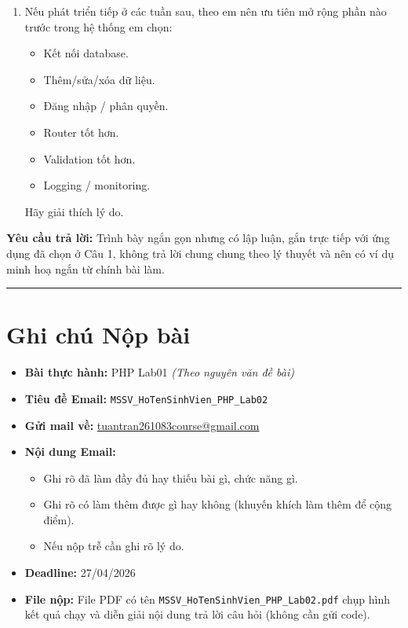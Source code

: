 \documentclass[12pt,a4paper]{article}
\begin{document}
\begin{enumerate}
    \item Nếu phát triển tiếp ở các tuần sau, theo em nên ưu tiên mở rộng phần nào trước trong hệ thống em chọn:
    \begin{itemize}[noitemsep]
        \item Kết nối database.
        \item Thêm/sửa/xóa dữ liệu.
        \item Đăng nhập / phân quyền.
        \item Router tốt hơn.
        \item Validation tốt hơn.
        \item Logging / monitoring.
    \end{itemize}
    Hãy giải thích lý do.
\end{enumerate}

\textbf{Yêu cầu trả lời:} Trình bày ngắn gọn nhưng có lập luận, gắn trực tiếp với ứng dụng đã chọn ở Câu 1, không trả lời chung chung theo lý thuyết và nên có ví dụ minh hoạ ngắn từ chính bài làm.

\vspace{5mm}
\hrule
\vspace{5mm}

\section*{Ghi chú Nộp bài}
\begin{itemize}
    \item \textbf{Bài thực hành:} PHP Lab01 \textit{(Theo nguyên văn đề bài)}
    \item \textbf{Tiêu đề Email:} \texttt{MSSV\_HoTenSinhVien\_PHP\_Lab02}
    \item \textbf{Gửi mail về:} \href{mailto:tuantran261083course@gmail.com}{tuantran261083course@gmail.com}
    \item \textbf{Nội dung Email:} 
    \begin{itemize}[noitemsep]
        \item Ghi rõ đã làm đầy đủ hay thiếu bài gì, chức năng gì.
        \item Ghi rõ có làm thêm được gì hay không (khuyến khích làm thêm để cộng điểm).
        \item Nếu nộp trễ cần ghi rõ lý do.
    \end{itemize}
    \item \textbf{Deadline:} 27/04/2026
    \item \textbf{File nộp:} File PDF có tên \texttt{MSSV\_HoTenSinhVien\_PHP\_Lab02.pdf} chụp hình kết quả chạy và diễn giải nội dung trả lời câu hỏi (không cần gửi code).
\end{itemize}
\end{document}

